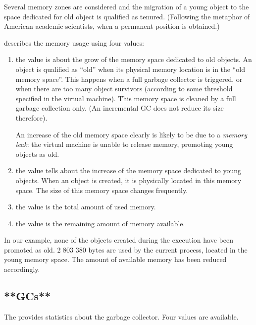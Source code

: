 \documentclass[a4paper,10pt,twoside]{book}
\begin{document}
Several memory zones are considered and the migration of a young object to the space dedicated for old object is qualified as tenured. (Following the metaphor of American academic scientists, when a permanent position is obtained.)

 describes the memory usage using four values:

\begin{enumerate}

\item the  value is about the grow of the memory space dedicated to old objects. An object is qualified as ``old'' when its physical memory location is in the ``old memory space''. This happens when a full garbage collector is triggered, or when there are too many object survivors (according to some threshold specified in the virtual machine). This memory space is cleaned by a full garbage collection only. (An incremental GC does not reduce its size therefore). 

An increase of the old memory space clearly is likely to be due to a \emph{memory leak}: the virtual machine is unable to release memory, promoting young objects as old.

\item the  value tells about the increase of the memory space dedicated to young objects. When an object is created, it is physically located in this memory space. The size of this memory space changes frequently. 

\item the  value is the total amount of used memory.

\item the  value is the remaining amount of memory available.
\end{enumerate}

In our example, none of the objects created during the execution have been promoted as old. 2 803 380 bytes are used by the current process, located in the young memory space. The amount of available memory has been reduced accordingly.

\subsection{**GCs**}

The  provides statistics about the garbage collector. Four values are available.
\end{document}
